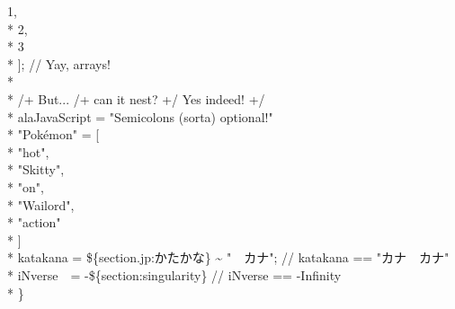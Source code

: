 \documentclass[12pt,english]{article}
\begin{document}
{\hspace*{2cm}\textcolor{src-numeric}{1}\textcolor{src-symbol}{,} \\*
\hspace*{2cm}\textcolor{src-numeric}{2}\textcolor{src-symbol}{,} \\*
\hspace*{2cm}\textcolor{src-numeric}{3} \\*
\hspace*{1cm}\textcolor{src-symbol}{];} \textcolor{src-comment}{// Yay, arrays!} \\*
 \\*
\hspace*{1cm}\textcolor{src-comment}{/+ But... /+ can it nest? +/ Yes indeed! +/} \\*
\hspace*{1cm}\textcolor{src-ident}{alaJavaScript} \textcolor{src-symbol}{=}
\textcolor{src-quote}{"}\textcolor{src-string}{Semicolons (sorta)
optional!}\textcolor{src-quote}{"} \\*
\hspace*{1cm}\textcolor{src-type}{"}\textcolor{src-ident}{Pokémon}\textcolor{src-type}{"}
\textcolor{src-symbol}{=} \textcolor{src-symbol}{[} \\*
\hspace*{2cm}\textcolor{src-quote}{"}\textcolor{src-string}{hot}\textcolor{src-quote}{"}\textcolor{src-symbol}{,}
\\*
\hspace*{2cm}\textcolor{src-quote}{"}\textcolor{src-string}{Skitty}\textcolor{src-quote}{"}\textcolor{src-symbol}{,}
\\*
\hspace*{2cm}\textcolor{src-quote}{"}\textcolor{src-string}{on}\textcolor{src-quote}{"}\textcolor{src-symbol}{,}
\\*
\hspace*{2cm}\textcolor{src-quote}{"}\textcolor{src-string}{Wailord}\textcolor{src-quote}{"}\textcolor{src-symbol}{,}
\\*
\hspace*{2cm}\textcolor{src-quote}{"}\textcolor{src-string}{action}\textcolor{src-quote}{"}
\\*
\hspace*{1cm}\textcolor{src-symbol}{]} \\*
\hspace*{1cm}\textcolor{src-ident}{katakana} \textcolor{src-symbol}{=}
\textcolor{src-type}{\$\{section.jp:\textsf{かたかな}\}}
\textasciitilde{}
\textcolor{src-quote}{"}\textcolor{src-string}{\textsf{　カナ}}\textcolor{src-quote}{"}\textcolor{src-symbol}{;}
\textcolor{src-comment}{// katakana == "\textsf{カナ　カナ}"} \\*
\hspace*{1cm}\textcolor{src-ident}{iNverse}~~\textcolor{src-symbol}{=}
\textcolor{src-symbol}{-}\textcolor{src-type}{\$\{section:singularity\}}
\textcolor{src-comment}{// iNverse == -Infinity} \\*
\textcolor{src-symbol}{\}}
}
\end{document}
